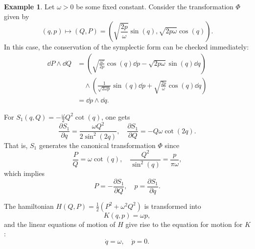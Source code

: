 \documentclass[english,fontsize=11pt,paper=b5]{scrbook}
\numberwithin{equation}{chapter}
\theoremstyle{definition}
\newtheorem{example}{Example}[chapter]
\begin{document}
    \begin{example}\label{ex:integrabilityho}
      Let $\omega > 0$ be some fixed constant.
      Consider the transformation $\Phi$ given by
      \begin{equation}
        (q,p) \mapsto (Q,P) = \left(
          \sqrt{\frac{2p}{\omega}} \sin(q),
          \sqrt{2p\omega}\cos(q)
        \right).
      \end{equation}
      In this case, the conservation of the symplectic form can be checked immediately:
      \begin{align}
        \dd P\wedge \dd Q & =
        \left(\sqrt{\frac{\omega}{2 p}}\cos(q)\dd p - \sqrt{2 p\omega} \sin(q)\dd q\right)           \\
                          & \quad\wedge
                          \left(\frac{1}{\sqrt{2\omega p}}\sin(q)\dd p + \sqrt{\frac{2 p}{\omega}} \cos(q)\dd q\right) \\
                          & = \dd p \wedge \dd q.
      \end{align}

      For $S_1(q,Q) = -\frac{\omega}{2}Q^2\cot(q)$, one gets
      \begin{equation}
        \frac{\partial S_1}{\partial q} = \frac{\omega Q^2}{2\sin^2(2q)}, \quad
        \frac{\partial S_1}{\partial Q} = - Q\omega \cot(2q).
      \end{equation}
      That is, $S_1$ generates the canonical transformation $\Phi$ since
      \begin{equation}
        \frac{P}{Q} = \omega\cot(q), \quad
        \frac{Q^2}{\sin^2(q)} = \frac{p}{\pi\omega},
      \end{equation}
      which implies
      \begin{equation}
        P = -\frac{\partial S_1}{\partial Q}, \quad
        p = \frac{\partial S_1}{\partial q}.
      \end{equation}

      The hamiltonian $H(Q,P) = \frac12 (P^2 + \omega^2 Q^2)$ is transformed into
      \begin{equation}
        K(q,p) = \omega p,
      \end{equation}
      and the linear equations of motion of $H$ give rise to the equation for motion for $K$:
      \begin{equation}
        \dot q = \omega, \quad \dot p = 0.
      \end{equation}
    \end{example}
\end{document}
